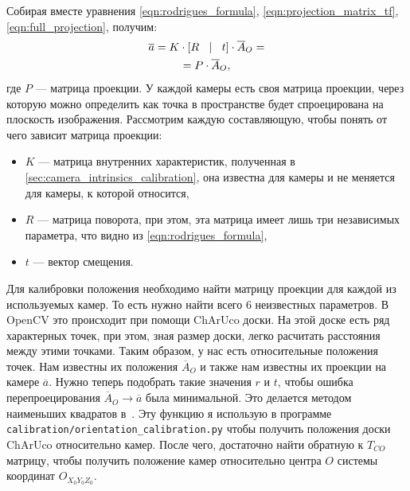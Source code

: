 \documentclass[12pt, a4paper]{article}
\begin{document}
Собирая вместе уравнения \eqref{eqn:rodrigues_formula},
\eqref{eqn:projection_matrix_tf}, \eqref{eqn:full_projection}, получим:
\begin{equation}
\begin{gathered}
    \overline{a} = K \cdot \left[R \quad \vline \quad t\right] \cdot \overline{A}_O = \\
    = P \cdot \overline{A}_O,
\end{gathered}
\label{eqn:proj_fomula_with_projection_matrix}
\end{equation}
где $P$ --- матрица проекции. У каждой камеры есть своя матрица проекции, через
которую можно определить как точка в пространстве будет спроецирована на
плоскость изображения.
Рассмотрим каждую составляющую, чтобы понять от чего зависит матрица проекции:
\begin{itemize}
    \item $K$ --- матрица внутренних характеристик, полученная в
    \ref{sec:camera_intrinsics_calibration}, она известна для камеры и не
    меняется для камеры, к которой относится,

    \item $R$ --- матрица поворота, при этом, эта матрица имеет лишь три
    независимых параметра, что видно из \ref{eqn:rodrigues_formula},

    \item $t$ --- вектор смещения.
\end{itemize}

Для калибровки положения необходимо найти матрицу проекции для каждой из
используемых камер. То есть нужно найти всего 6 неизвестных параметров. В OpenCV
это происходит при помощи ChArUco доски. На этой доске есть ряд характерных
точек, при этом, зная размер доски, легко расчитать расстояния между этими
точками. Таким образом, у нас есть относительные положения точек. Нам известны
их положения $\overline{A}_O$ и также нам известны их проекции на камере
$\overline{a}$. Нужно теперь подобрать такие значения $r$ и $t$, чтобы ошибка
перепроецирования $\overline{A}_O \rightarrow \overline{a}$ была минимальной.
Это делается методом наименьших квадратов в~\cite{opencv_charuco_pose}. Эту функцию
я использую в программе \texttt{calibration/orientation\_calibration.py} чтобы
получить положения доски ChArUco относительно камер. После чего, достаточно найти обратную к $T_{CO}$ матрицу, чтобы получить положение камер относительно центра $O$ системы координат $O_{X_0Y_0Z_0}$.
\end{document}
